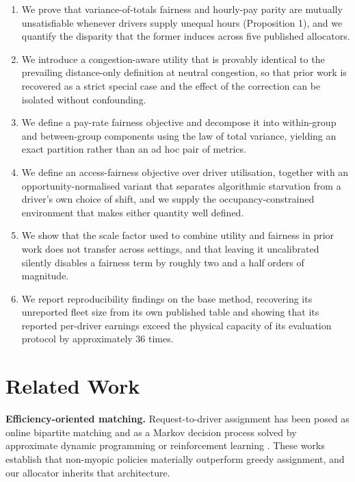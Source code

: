 \documentclass[10pt,twocolumn]{article}
\begin{document}
\begin{enumerate}
\itemsep2pt
  \item We prove that variance-of-totals fairness and hourly-pay parity are mutually unsatisfiable whenever drivers supply unequal hours (Proposition 1), and we quantify the disparity that the former induces across five published allocators.
  \item We introduce a congestion-aware utility that is provably identical to the prevailing distance-only definition at neutral congestion, so that prior work is recovered as a strict special case and the effect of the correction can be isolated without confounding.
  \item We define a pay-rate fairness objective and decompose it into within-group and between-group components using the law of total variance, yielding an exact partition rather than an ad hoc pair of metrics.
  \item We define an access-fairness objective over driver utilisation, together with an opportunity-normalised variant that separates algorithmic starvation from a driver's own choice of shift, and we supply the occupancy-constrained environment that makes either quantity well defined.
  \item We show that the scale factor used to combine utility and fairness in prior work does not transfer across settings, and that leaving it uncalibrated silently disables a fairness term by roughly two and a half orders of magnitude.
  \item We report reproducibility findings on the base method, recovering its unreported fleet size from its own published table and showing that its reported per-driver earnings exceed the physical capacity of its evaluation protocol by approximately 36 times.
\end{enumerate}
\section{Related Work}
\textbf{Efficiency-oriented matching.} Request-to-driver assignment has been posed as online bipartite matching \cite{zhao2019,tong2020} and as a Markov decision process solved by approximate dynamic programming or reinforcement learning \cite{shah2020,delima2020,raman2021,sun2022}. These works establish that non-myopic policies materially outperform greedy assignment, and our allocator inherits that architecture.
\end{document}
